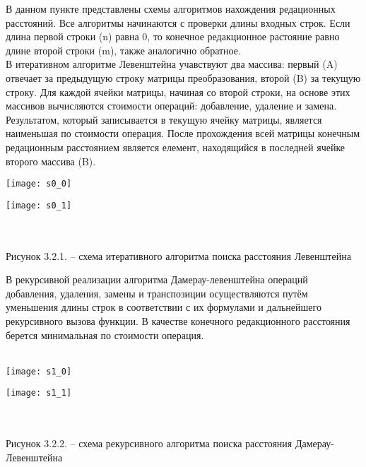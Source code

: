 \documentclass[a4paper, 14pt]{article}
\begin{document}
	В данном пункте представлены схемы алгоритмов нахождения редационных расстояний. Все алгоритмы начинаются с проверки длины входных строк. Если длина первой строки (n) равна 0, то конечное редакционное растояние равно длине второй строки (m), также аналогично обратное. \\
	
	В итеративном алгоритме Левенштейна учавствуют два массива: первый (A) отвечает за предыдущую строку матрицы преобразования, второй (B) за текущую строку. Для каждой ячейки матрицы, начиная со второй строки, на основе этих массивов вычисляются стоимости операций: добавление, удаление и замена. Результатом, который записывается в текущую ячейку матрицы, является наименьшая по стоимости операция. После прохождения всей матрицы конечным редационным расстоянием является елемент, находящийся в последней ячейке второго массива (B). \\
	
	\begin{minipage}{6cm}
		\texttt{[image: s0\_0]}
	\end{minipage}
	\begin{minipage}{2in}
		\texttt{[image: s0\_1]}
	\end{minipage} \\\\
	
	\small Рисунок 3.2.1. – схема итеративного алгоритма поиска расстояния Левенштейна \normalsize
	
	\newpage
	
	В рекурсивной реализации алгоритма Дамерау-левенштейна операций добавления, удаления, замены и транспозиции осуществляются путём уменьшения длины строк в соответствии с их формулами и дальнейшего рекурсивного вызова функции. В качестве конечного редакционного расстояния берется минимальная по стоимости операция. \\\\
	
	\begin{minipage}{8cm}
		\texttt{[image: s1\_0]}
	\end{minipage}
	\begin{minipage}{2in}
		\texttt{[image: s1\_1]}
	\end{minipage}\\\\
	
	\small Рисунок 3.2.2. – схема рекурсивного алгоритма поиска расстояния Дамерау-Левенштейна \normalsize
	
\end{document}

